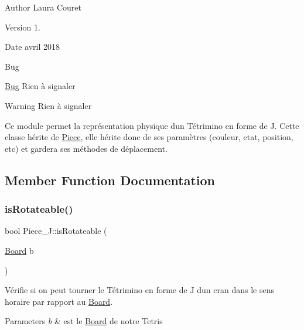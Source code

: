 \begin{DoxyAuthor}{Author}
Laura Couret 
\end{DoxyAuthor}
\begin{DoxyVersion}{Version}
1. 
\end{DoxyVersion}
\begin{DoxyDate}{Date}
avril 2018 
\end{DoxyDate}
\begin{DoxyRefDesc}{Bug}
\item[\hyperlink{bug__bug000012}{Bug}]Rien à signaler \end{DoxyRefDesc}
\begin{DoxyWarning}{Warning}
Rien à signaler
\end{DoxyWarning}
Ce module permet la représentation physique d\textquotesingle{}un Tétrimino en forme de J. Cette classe hérite de \hyperlink{classPiece}{Piece}, elle hérite donc de ses paramètres (couleur, etat, position, etc) et gardera ses méthodes de déplacement. 

\subsection{Member Function Documentation}
\mbox{\label{classPiece__J_aee0abd6254be3a50a86ff5464bb459f8}} 
\subsubsection{\texorpdfstring{is\+Rotateable()}{isRotateable()}}
{\footnotesize\ttfamily bool Piece\+\_\+\+J\+::is\+Rotateable (\begin{DoxyParamCaption}\item[{\hyperlink{classBoard}{Board}}]{b }\end{DoxyParamCaption})\hspace{0.3cm}{\ttfamily [virtual]}}



Vérifie si on peut tourner le Tétrimino en forme de J d\textquotesingle{}un cran dans le sens horaire par rapport au \hyperlink{classBoard}{Board}. 


\begin{DoxyParams}{Parameters}
{\em b} & est le \hyperlink{classBoard}{Board} de notre Tetris \\
\hline
\end{DoxyParams}


